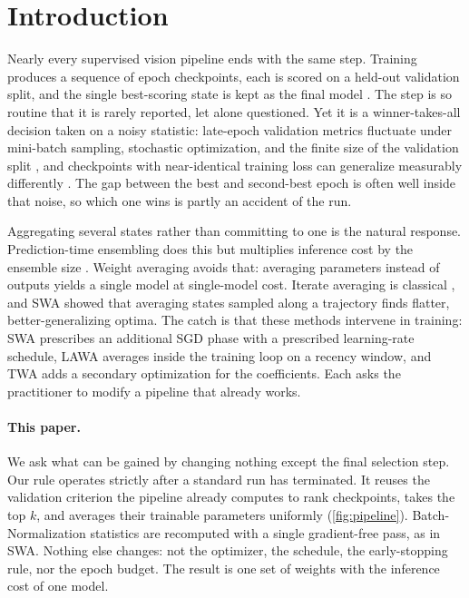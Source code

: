 \section{Introduction}
\label{sec:intro}



Nearly every supervised vision pipeline ends with the same step. Training
produces a sequence of epoch checkpoints, each is scored on a held-out
validation split, and the single best-scoring state is kept as the final model
\cite{bishop2006pattern,prechelt2002early}. The step is so routine that it is
rarely reported, let alone questioned. Yet it is a winner-takes-all decision
taken on a noisy statistic: late-epoch validation metrics fluctuate under
mini-batch sampling, stochastic optimization, and the finite size of the
validation split \cite{prechelt2002early,izmailov2019averagingweightsleadswider,garipov2018losssurfacesmodeconnectivity},
and checkpoints with near-identical training loss can generalize
measurably differently \cite{keskar2017largebatchtrainingdeeplearning}. The gap
between the best and second-best epoch is often well inside that noise, so
which one wins is partly an accident of the run.

Aggregating several states rather than committing to one is the natural
response. Prediction-time ensembling does this but multiplies inference cost by
the ensemble size \cite{dietterich2000ensemble}. Weight averaging avoids that:
averaging parameters instead of outputs yields a single model at single-model
cost. Iterate averaging is classical \cite{polyak1992acceleration}, and SWA
\cite{izmailov2019averagingweightsleadswider} showed that averaging states
sampled along a trajectory finds flatter, better-generalizing optima. The catch
is that these methods intervene in training: SWA prescribes an additional SGD
phase with a prescribed learning-rate schedule, LAWA \cite{kaddour2022stop}
averages inside the training loop on a recency window, and TWA
\cite{li2022trainable} adds a secondary optimization for the coefficients. Each
asks the practitioner to modify a pipeline that already works.

\paragraph{This paper.}
We ask what can be gained by changing nothing except the final selection step.
Our rule operates strictly after a standard run has terminated. It reuses the
validation criterion the pipeline already computes to rank checkpoints, takes
the top $k$, and averages their trainable parameters uniformly
(\cref{fig:pipeline}). Batch-Normalization statistics are recomputed with a
single gradient-free pass, as in SWA. Nothing else changes: not the optimizer,
the schedule, the early-stopping rule, nor the epoch budget. The result is one
set of weights with the inference cost of one model.

